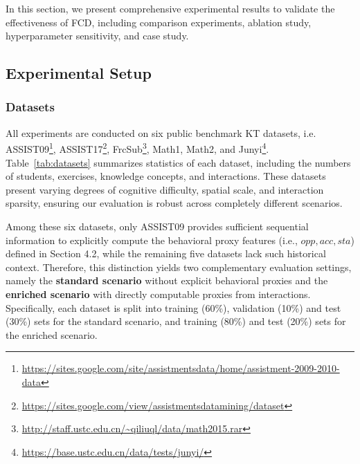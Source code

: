 \documentclass[runningheads]{llncs}
\def\mymethod{FCD}
\begin{document}
In this section, we present comprehensive experimental results to validate the effectiveness of \mymethod, including comparison experiments, ablation study, hyperparameter sensitivity, and case study. 

\subsection{Experimental Setup}

\subsubsection{Datasets}
All experiments are conducted on six public benchmark KT datasets, i.e. ASSIST09\footnote{\url{https://sites.google.com/site/assistmentsdata/home/assistment-2009-2010-data}}, 
ASSIST17\footnote{\url{https://sites.google.com/view/assistmentsdatamining/dataset}}, 
FrcSub\footnote{\url{http://staff.ustc.edu.cn/~qiliuql/data/math2015.rar}}, 
Math1\footnotemark[3], Math2\footnotemark[3], and 
Junyi\footnote{\url{https://base.ustc.edu.cn/data/tests/junyi/}}. Table~\ref{tab:datasets} summarizes statistics of each dataset, including the numbers of students, exercises, knowledge concepts, and interactions. These datasets present varying degrees of cognitive difficulty, spatial scale, and interaction sparsity, ensuring our evaluation is robust across completely different scenarios. 

Among these six datasets, only ASSIST09 provides sufficient sequential information to explicitly compute the behavioral proxy features (i.e., $opp, acc, sta$) defined in Section 4.2, while the remaining five datasets lack such historical context. Therefore, this distinction yields two complementary evaluation settings, namely the \textbf{standard scenario} without explicit behavioral proxies and the \textbf{enriched scenario} with directly computable proxies from interactions. Specifically, each dataset is split into training (60\%), validation (10\%) and test (30\%) sets for the standard scenario, and training (80\%) and test (20\%) sets for the enriched scenario.
\end{document}
